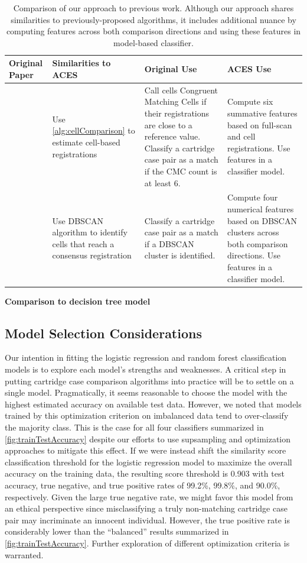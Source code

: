 \documentclass[reprint]{JASA}
\begin{document}
\begin{table}[htbp]
\centering
\begin{tabular}{p{.18\linewidth} p{.23\linewidth} p{.23\linewidth} p{.23\linewidth}}
Original Paper & Similarities to ACES & Original Use & ACES Use \\
\hline
\citet{song_proposed_2013} & Use \autoref{alg:cellComparison} to estimate cell-based registrations & Call cells Congruent Matching Cells if their registrations are close to a reference value. Classify a cartridge case pair as a match if the CMC count is at least 6. & Compute six summative features based on full-scan and cell registrations. Use features in a classifier model. \\
\hline
\citet{zhang_convergence_2021} & Use DBSCAN algorithm to identify cells that reach a consensus registration & Classify a cartridge case pair as a match if a DBSCAN cluster is identified. & Compute four numerical features based on DBSCAN clusters across both comparison directions. Use features in a classifier model.
\end{tabular}
\caption{Comparison of our approach to previous work. Although our approach shares similarities to previously-proposed algorithms, it includes additional nuance by computing features across both comparison directions and using these features in model-based classifier.}
\label{tab:previousWorkComparison}
\end{table}

\textbf{Comparison to decision tree model}

\hypertarget{model-selection-considerations}{%
\subsection{Model Selection
Considerations}\label{model-selection-considerations}}

Our intention in fitting the logistic regression and random forest
classification models is to explore each model's strengths and
weaknesses. A critical step in putting cartridge case comparison
algorithms into practice will be to settle on a single model.
Pragmatically, it seems reasonable to choose the model with the highest
estimated accuracy on available test data. However, we noted that models
trained by this optimization criterion on imbalanced data tend to
over-classify the majority class. This is the case for all four
classifiers summarized in \autoref{fig:trainTestAccuracy} despite our
efforts to use supsampling and optimization approaches to mitigate this
effect. If we were instead shift the similarity score classification
threshold for the logistic regression model to maximize the overall
accuracy on the training data, the resulting score threshold is 0.903
with test accuracy, true negative, and true positive rates of 99.2\%,
99.8\%, and 90.0\%, respectively. Given the large true negative rate, we
might favor this model from an ethical perspective since misclassifying
a truly non-matching cartridge case pair may incriminate an innocent
individual. However, the true positive rate is considerably lower than
the ``balanced'' results summarized in \autoref{fig:trainTestAccuracy}.
Further exploration of different optimization criteria is warranted.
\end{document}
